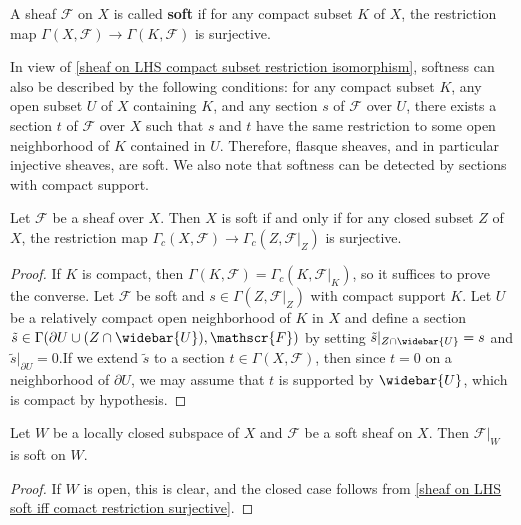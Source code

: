 \begin{definition}
A sheaf $\mathscr{F}$ on $X$ is called \textbf{soft} if for any compact subset $K$ of $X$, the restriction map $\Gamma(X,\mathscr{F})\to\Gamma(K,\mathscr{F})$ is surjective.
\end{definition}
In view of \cref{sheaf on LHS compact subset restriction isomorphism}, softness can also be described by the following conditions: for any compact subset $K$, any open subset $U$ of $X$ containing $K$, and any section $s$ of $\mathscr{F}$ over $U$, there exists a section $t$ of $\mathscr{F}$ over $X$ such that $s$ and $t$ have the same restriction to some open neighborhood of $K$ contained in $U$. Therefore, flasque sheaves, and in particular injective sheaves, are soft. We also note that softness can be detected by sections with compact support.

\begin{proposition}\label{sheaf on LHS soft iff comact restriction surjective}
Let $\mathscr{F}$ be a sheaf over $X$. Then $X$ is soft if and only if for any closed subset $Z$ of $X$, the restriction map $\Gamma_c(X,\mathscr{F})\to\Gamma_c(Z,\mathscr{F}|_Z)$ is surjective.
\end{proposition}
\begin{proof}
If $K$ is compact, then $\Gamma(K,\mathscr{F})=\Gamma_c(K,\mathscr{F}|_K)$, so it suffices to prove the converse. Let $\mathscr{F}$ be soft and $s\in\Gamma(Z,\mathscr{F}|_Z)$ with compact support $K$. Let $U$ be a relatively compact open neighborhood of $K$ in $X$ and define a section $\tilde{s}\in\Gamma(\partial U\cup(Z\cap\widebar{U}),\mathscr{F})$ by setting $\tilde{s}|_{Z\cap\widebar{U}}=s$ and $\tilde{s}|_{\partial U}=0$.If we extend $\tilde{s}$ to a section $t\in\Gamma(X,\mathscr{F})$, then since $t=0$ on a neighborhood of $\partial U$, we may assume that $t$ is supported by $\widebar{U}$, which is compact by hypothesis.
\end{proof}

\begin{corollary}\label{sheaf on LHS soft restriction to locally closed}
Let $W$ be a locally closed subspace of $X$ and $\mathscr{F}$ be a soft sheaf on $X$. Then $\mathscr{F}|_W$ is soft on $W$.
\end{corollary}
\begin{proof}
If $W$ is open, this is clear, and the closed case follows from \cref{sheaf on LHS soft iff comact restriction surjective}.
\end{proof}

